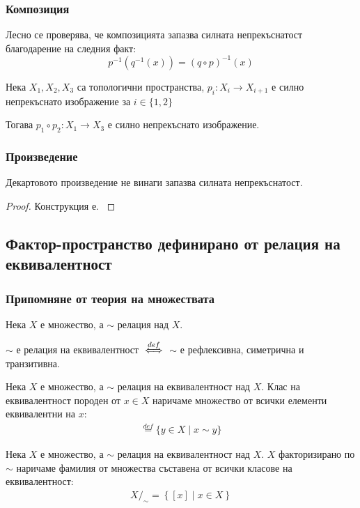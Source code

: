 \subsubsection{Композиция}
Лесно се проверява, че композицията запазва силната непрекъснатост благодарение на следния факт:
\begin{equation}
    p^{-1}(q^{-1}(x)) = (q \circ p)^{-1}(x)
\end{equation}
\begin{proposition}
    Нека $X_1, X_2, X_3$ са топологични пространства, $p_i: X_i \to X_{i+1}$ е силно непрекъснато изображение за $i \in \{1, 2\}$

    Тогава $p_1 \circ p_2 : X_1 \to X_3$ е силно непрекъснато изображение.
\end{proposition}

\subsubsection{Произведение}
Декартовото произведение не винаги запазва силната непрекъснатост.
\begin{proof}
    Конструкция е.
    \cite[стр.~143]{munkrestopology}
\end{proof}

\subsection{Фактор-пространство дефинирано от релация на еквивалентност}
\subsubsection{Припомняне от теория на множествата}
\begin{definition}
    Нека $X$ е множество, а $\sim$ релация над $X$.

    $\sim$ е релация на еквивалентност ${\overset{def}{\iff}}$ $\sim$ е рефлексивна, симетрична и транзитивна.
\end{definition}
\begin{definition}
    Нека $X$ е множество, а $\sim$ релация на еквивалентност над $X$. Клас на еквивалентност породен от $x \in X$ наричаме множество от всички елементи еквивалентни на $x$:
    \begin{eqnarray}
        [x] \overset{def}{=} \{y \in X \mid x \sim y \}
    \end{eqnarray}
\end{definition}

\begin{definition}
    Нека $X$ е множество, а $\sim$ релация на еквивалентност над $X$. $X$ факторизирано по $\sim$ наричаме фамилия от множества съставена от всички класове на еквивалентност:
    \begin{eqnarray}
        X/_\sim = \left\{[x] \mid x \in X\right\}
    \end{eqnarray}
\end{definition}

